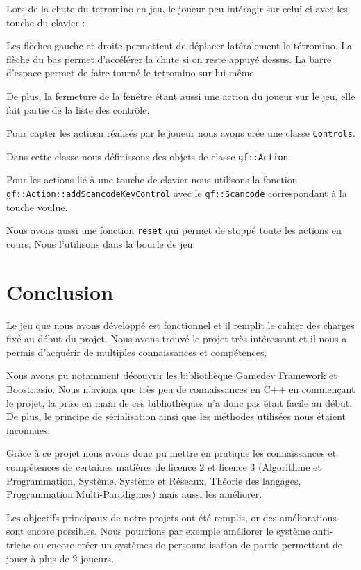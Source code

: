 \documentclass[a4paper, 12pt]{article}
\begin{document}
			Lors de la chute du tetromino en jeu, le joueur peu intéragir sur celui ci avec les touche du clavier :

			Les flèches gauche et droite permettent de déplacer latéralement le tétromino.
			La flèche du bas permet d’accélérer la chute si on reste appuyé dessus.
			La barre d’espace permet de faire tourné le tetromino sur lui même.

			De plus, la fermeture de la fenêtre étant aussi une action du joueur sur le jeu, elle fait partie de la liste des contrôle.


			Pour capter les actiosn réalisés par le joueur nous avons crée une classe \texttt{Controls}.

			Dans cette classe nous définissons des objets de classe \texttt{gf::Action}.

			Pour les actions lié à une touche de clavier nous utilisons la fonction \texttt{gf::Action::addScancodeKeyControl} avec le \texttt{gf::Scancode} correspondant à la touche voulue.

			Nous avons aussi une fonction \texttt{reset} qui permet de stoppé toute les actions en cours. Nous l’utilisons dans la boucle de jeu.
	
	

\section*{Conclusion}

Le jeu que nous avons développé est fonctionnel et il remplit le cahier des charges fixé au début du projet. 
Nous avons trouvé le projet très intéressant et il nous a permis d’acquérir de multiples connaissances et compétences. 

Nous avons pu notamment découvrir les bibliothèque Gamedev Framework et Boost::asio. Nous n’avions que très peu de connaissances en C++ en commençant le projet, la prise en main de ces bibliothèques n’a donc pas était facile au début. De plus, le principe de sérialisation ainsi que les méthodes utilisées nous étaient inconnues.

Grâce à ce projet nous avons donc pu mettre en pratique les connaissances et compétences de certaines matières de licence 2 et licence 3 (Algorithme et Programmation, Système, Système et Réseaux, Théorie des langages, Programmation Multi-Paradigmes) mais aussi les améliorer.

Les objectifs principaux de notre projets ont été remplis, or des améliorations sont encore possibles.
Nous pourrions par exemple améliorer le système anti-triche ou encore créer un systèmes de personnalisation de partie permettant de jouer à plus de 2 joueurs.
\end{document}
